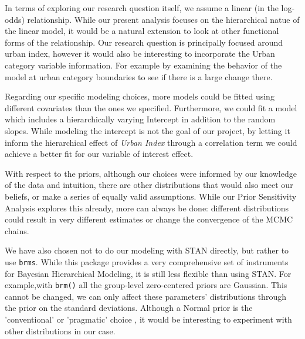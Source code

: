 \documentclass[12pt]{article}
\begin{document}

In terms of exploring our research question itself, we assume a linear (in the log-odds) relationship. While our present analysis focuses on the hierarchical natue of the linear model, it would be a natural extension to look at other functional forms of the relationship. Our research question is principally focused around urban index, however it would also be interesting to incorporate the Urban category variable information. For example by examining the behavior of the model at urban category boundaries to see if there is a large change there.

Regarding our specific modeling choices, more models could be fitted using different covariates than the ones we specified. Furthermore, we could fit a model which includes a hierarchically varying Intercept in addition to the random slopes. While modeling the intercept is not the goal of our project, by letting it inform the hierarchical effect of \textit{Urban Index} through a correlation term we could achieve a better fit for our variable of interest effect.


With respect to the priors, although our choices were informed by our knowledge of the data and intuition, there are other distributions that would also meet our beliefs, or make a series of equally valid assumptions. While our Prior Sensitivity Analysis explores this already, more can always be done: different distributions could result in very different estimates or change the convergence of the MCMC chains. 


We have also chosen not to do our modeling with STAN directly, but rather to use \verb|brms|. While this package provides a very comprehensive set of instruments for Bayesian Hierarchical Modeling, it is still less flexible than using STAN. For example,with \verb|brm()| all the group-level zero-centered priors are Gaussian. This cannot be changed, we can only affect these parameters' distributions through the prior on the standard deviations. Although a Normal prior is the 'conventional' or 'pragmatic' choice \parencite{mcelreath2016statistical}, it would be interesting to experiment with other distributions in our case.
\end{document}
